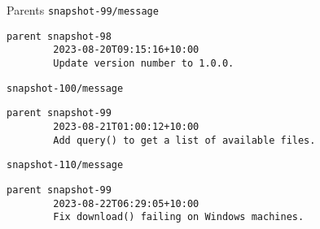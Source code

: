 \begin{frame}[fragile]{Parents}
	\texttt{snapshot-99/message}
	\begin{lstlisting}[frame=single,tabsize=4,gobble=8]
		parent snapshot-98
		2023-08-20T09:15:16+10:00
		Update version number to 1.0.0.
	\end{lstlisting}
	
	\texttt{snapshot-100/message}
	\begin{lstlisting}[frame=single,tabsize=4,gobble=8]
		parent snapshot-99
		2023-08-21T01:00:12+10:00
		Add query() to get a list of available files.
	\end{lstlisting}
	
	\texttt{snapshot-110/message}
	\begin{lstlisting}[frame=single,tabsize=4,gobble=8]
		parent snapshot-99
		2023-08-22T06:29:05+10:00
		Fix download() failing on Windows machines.
	\end{lstlisting}
	
\end{frame}

